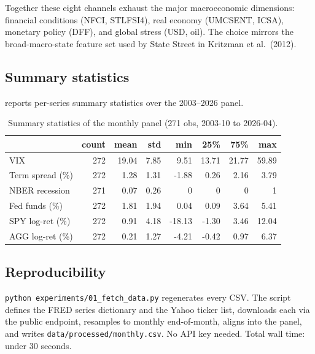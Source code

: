\documentclass[11pt]{article}
\theoremstyle{plain1}
\theoremstyle{definition1}
\newcommand{\1}{\mathbf{1}}
\begin{document}
Together these eight channels exhaust the major macroeconomic dimensions: financial conditions (NFCI, STLFSI4), real economy (UMCSENT, ICSA), monetary policy (DFF), and global stress (USD, oil). The choice mirrors the broad-macro-state feature set used by State Street in Kritzman et al.\ (2012).

\subsection{Summary statistics}

 reports per-series summary statistics over the 2003--2026 panel.

\begin{table}[t]\centering
\caption{Summary statistics of the monthly panel (271 obs, 2003-10 to 2026-04).}\label{tab:summary-stats}
\small
\setlength{\tabcolsep}{4pt}
\begin{tabular}{l rrrrrrr}
\toprule
& \textbf{count} & \textbf{mean} & \textbf{std} & \textbf{min} & \textbf{25\%} & \textbf{75\%} & \textbf{max} \\
\midrule
VIX               & 272 & 19.04 & 7.85 & 9.51 & 13.71 & 21.77 & 59.89 \\
Term spread (\%)  & 272 & 1.28  & 1.31 & -1.88 & 0.26 & 2.16 & 3.79 \\
NBER recession    & 271 & 0.07  & 0.26 & 0 & 0 & 0 & 1 \\
Fed funds (\%)    & 272 & 1.81  & 1.94 & 0.04 & 0.09 & 3.64 & 5.41 \\
SPY log-ret (\%)  & 272 & 0.91  & 4.18 & -18.13 & -1.30 & 3.46 & 12.04 \\
AGG log-ret (\%)  & 272 & 0.21  & 1.27 & -4.21 & -0.42 & 0.97 & 6.37 \\
\bottomrule
\end{tabular}
\end{table}

\subsection{Reproducibility}

\texttt{python experiments/01\_fetch\_data.py} regenerates every CSV. The script defines the FRED series dictionary and the Yahoo ticker list, downloads each via the public endpoint, resamples to monthly end-of-month, aligns into the panel, and writes \texttt{data/processed/monthly.csv}. No API key needed. Total wall time: under 30 seconds.

\end{document}
